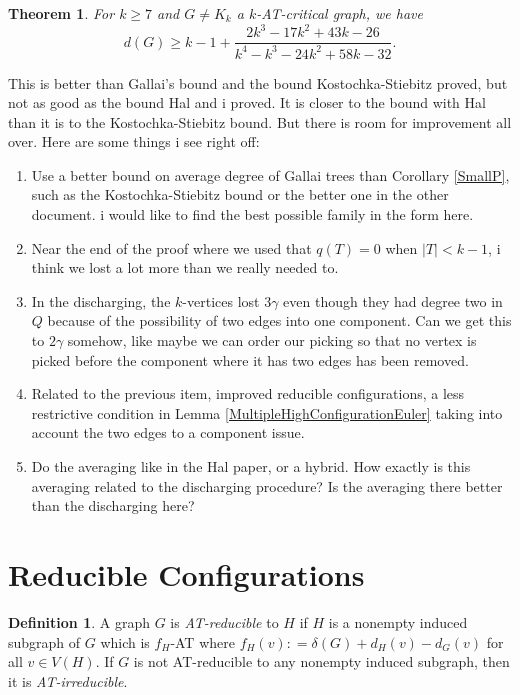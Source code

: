 \documentclass[12pt]{article}
\theoremstyle{plain}
\newtheorem{thm}{Theorem}[section]
\theoremstyle{definition}
\newtheorem{defn}{Definition}
\theoremstyle{remark}
\newcommand{\DefinedAs}{\mathrel{\mathop:}=}
\begin{document}
\begin{thm}
	For $k \ge 7$ and $G \ne K_k$ a $k$-AT-critical graph, we have
	\[d(G) \ge k-1 + \frac{2 k^3-17 k^2+43 k-26}{k^4-k^3-24 k^2+58 k-32}.\]
\end{thm}

This is better than Gallai's bound and the bound Kostochka-Stiebitz proved, but not as good as the bound Hal and i proved.  It is closer to the bound with Hal than it is to the Kostochka-Stiebitz bound.  
But there is room for improvement all over.  Here are some things i see right off:

\begin{enumerate}
	\item Use a better bound on average degree of Gallai trees than Corollary \ref{SmallP}, such as the Kostochka-Stiebitz bound or the better one in the other document.  i would like to find the best possible family in the form here.
	\item Near the end of the proof where we used that $q(T) = 0$ when $|T| < k-1$, i think we lost a lot more than we really needed to.
	\item In the discharging, the $k$-vertices lost $3\gamma$ even though they had degree two in $Q$ because of the possibility of two edges into one component.  Can we get this to $2\gamma$ somehow, like maybe we can order our picking so that no vertex is picked before the component where it has two edges has been removed.   
	\item Related to the previous item, improved reducible configurations, a less restrictive condition in Lemma \ref{MultipleHighConfigurationEuler} taking into account the two edges to a component issue.
	\item Do the averaging like in the Hal paper, or a hybrid.  How exactly is this averaging related to the discharging procedure?  Is the averaging there better than the discharging here?
\end{enumerate}

\section{Reducible Configurations}
\begin{defn}
	A graph $G$ is \emph{AT-reducible} to $H$ if $H$ is a nonempty induced subgraph of $G$ which is $f_H$-AT where $f_H(v) \DefinedAs \delta(G) + d_H(v) - d_G(v)$ for all $v \in V(H)$.  
	If $G$ is not AT-reducible to any nonempty induced subgraph, then it is \emph{AT-irreducible}.
\end{defn}
\end{document}

